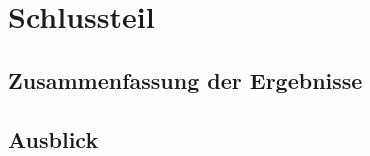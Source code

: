 \documentclass[listof=totoc, bibliography=totoc]{scrartcl}
\begin{document}
	\section{Schlussteil}
	\subsection{Zusammenfassung der Ergebnisse}
	
	\subsection{Ausblick}
	
	\newpage
	\setcounter{page}{1}
	\printbibliography
	\listoffigures
	\listoftables
\end{document}
